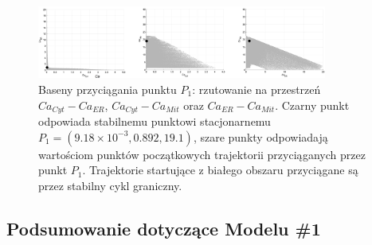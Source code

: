 \begin{figure}[ht]
	\centering
	\includegraphics[width=0.85\textwidth]{rysunki/rozdzial_5/basenMo1}
	\caption[Baseny przyciągania punktu $P_1$ w Modelu \#1]{Baseny przyciągania punktu $P_1$: rzutowanie na przestrzeń $Ca_{Cyt} - Ca_{ER}$, $Ca_{Cyt} - Ca_{Mit}$ oraz $Ca_{ER} - Ca_{Mit}$. Czarny punkt odpowiada stabilnemu punktowi stacjonarnemu $P_1 = (9.18 \times 10^{-3}, 0.892, 19.1)$, szare punkty odpowiadają wartościom punktów początkowych trajektorii przyciąganych przez punkt $P_1$. Trajektorie startujące z białego obszaru przyciągane są przez stabilny cykl graniczny.}
	\label{fig:basinofattractionMo1}
\end{figure}



\FloatBarrier
\subsection{Podsumowanie dotyczące Modelu \#1}


